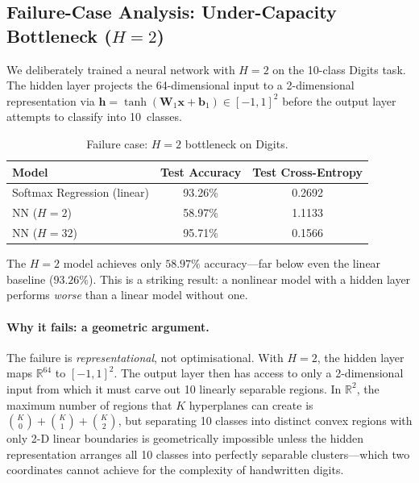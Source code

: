 \documentclass[11pt]{article}
\newcommand{\R}{\mathbb{R}}
\newcommand{\bx}{\mathbf{x}}
\newcommand{\bW}{\mathbf{W}}
\newcommand{\bb}{\mathbf{b}}
\newcommand{\bh}{\mathbf{h}}
\begin{document}
\subsection{Failure-Case Analysis: Under-Capacity Bottleneck ($H{=}2$)}
\label{sec:failure}

We deliberately trained a neural network with $H{=}2$ on the 10-class Digits task.  The
hidden layer projects the 64-dimensional input to a 2-dimensional representation via
$\bh = \tanh(\bW_1\bx + \bb_1) \in [-1,1]^2$ before the output layer attempts to
classify into 10~classes.

\begin{table}[H]
\centering
\caption{Failure case: $H{=}2$ bottleneck on Digits.}
\label{tab:failure}
\begin{tabular}{@{}lcc@{}}
\toprule
\textbf{Model} & \textbf{Test Accuracy} & \textbf{Test Cross-Entropy} \\
\midrule
Softmax Regression (linear) & 93.26\% & 0.2692 \\
NN ($H{=}2$) & 58.97\% & 1.1133 \\
NN ($H{=}32$) & 95.71\% & 0.1566 \\
\bottomrule
\end{tabular}
\end{table}

The $H{=}2$ model achieves only $58.97\%$ accuracy---far below even the linear baseline
($93.26\%$).  This is a striking result: a nonlinear model with a hidden layer performs
\emph{worse} than a linear model without one.

\paragraph{Why it fails: a geometric argument.}
The failure is \emph{representational}, not optimisational.  With $H{=}2$, the hidden
layer maps $\R^{64}$ to $[-1,1]^2$.  The output layer then has access to only a
2-dimensional input from which it must carve out 10 linearly separable regions.  In
$\R^2$, the maximum number of regions that $K$ hyperplanes can create is
$\binom{K}{0}+\binom{K}{1}+\binom{K}{2}$, but separating 10 classes into distinct convex
regions with only 2-D linear boundaries is geometrically impossible unless the hidden
representation arranges all 10 classes into perfectly separable clusters---which two
coordinates cannot achieve for the complexity of handwritten digits.

\end{document}
